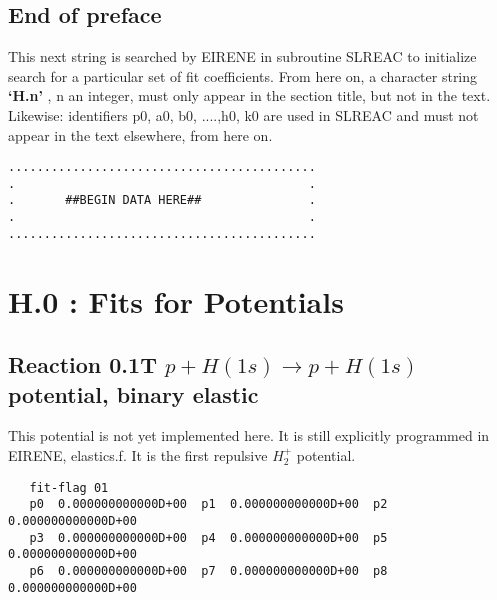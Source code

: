 \documentclass[12pt,dvipdfmx]{article}
\begin{document}
\subsection{End of preface}
This next string is searched by EIRENE in subroutine SLREAC
to initialize search for a particular set of fit coefficients.
From here on, a character string \textbf{`H.n'} , n an integer, must only appear in the
section title,
but not in the text. Likewise: identifiers p0, a0, b0, ....,h0, k0 are used
in SLREAC and must not
appear in the text elsewhere, from here on.

\bigskip
\begin{small}\begin{verbatim}
...........................................
.                                         .
.       ##BEGIN DATA HERE##               .
.                                         .
...........................................
\end{verbatim}\end{small}
\newpage
\renewcommand{\theHsection}{arabicsection.\thesection}
\renewcommand\thesection{\arabic{section}}
\setcounter{section}{-1}
\section{H.0 :  Fits for Potentials}\label{secpot}

\subsection{
Reaction 0.1T $ p + H(1s) \rightarrow p + H(1s) $ potential, binary elastic }
This potential is not yet implemented here. It is still explicitly
programmed in EIRENE, elastics.f. It is the first repulsive $H_2^+$
potential.

\begin{small}\begin{verbatim}
   fit-flag 01
   p0  0.000000000000D+00  p1  0.000000000000D+00  p2  0.000000000000D+00
   p3  0.000000000000D+00  p4  0.000000000000D+00  p5  0.000000000000D+00
   p6  0.000000000000D+00  p7  0.000000000000D+00  p8  0.000000000000D+00
\end{verbatim}\end{small}
\end{document}
